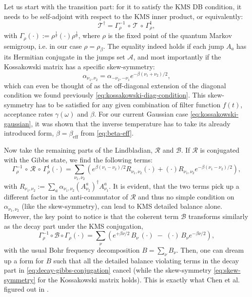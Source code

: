 Let us start with the transition part: for it to satisfy the KMS DB condition, it needs to be self-adjoint with respect to the KMS inner product, or equivalently: 
\begin{equation} \label{eq:transition-self-adjoint}
    \mathcal{T}^\dagger = \Gamma_\rho^{-1}\, \circ \, \mathcal{T}\, \circ\, \Gamma_\rho^{1},
\end{equation}
with $\Gamma_\rho(\cdot) := \rho^{\frac{1}{2}} (\cdot) \rho^{\frac{1}{2}}$, where $\rho$ is the fixed point of the quantum Markov semigroup, i.e. in our case $\rho = \rho_\beta$. The equality indeed holds if each jump $A_a$ has its Hermitian conjugate in the jumps set $\mathcal{A}$, and most importantly if the Kossakowski matrix has a specific skew-symmetry:
\begin{equation} \label{eq:skew-symmetry}
    \alpha_{\nu_1, \nu_2} = \alpha_{-\nu_2, -\nu_1} e^{-\beta(\nu_1 + \nu_2) / 2},
\end{equation}
which can even be thought of as the off-diagonal extension of the diagonal condition we found previously \eqref{eq:kossakowski-diag-condition}.
This skew-symmetry has to be satisfied for any given combination of filter function $f(t)$, acceptance rates $\gamma(\omega)$ and $\beta$. For our current Gaussian case \eqref{eq:kossakowski-gaussian}, it was shown that the inverse temperature has to take its already introduced form, $\beta = \beta_\text{eff}$ from \eqref{eq:beta-eff}. 

Now take the remaining parts of the Lindbladian, $\mathcal{R}$ and $\mathcal{B}$. If $\mathcal{R}$ is conjugated with the Gibbs state, we find the following terms: 
\begin{equation} \label{eq:decay-gibbs-conjugation}
    \Gamma_\rho^{-1}\, \circ \, \mathcal{R}\, \circ\, \Gamma_\rho^{1}(\cdot) =\sum_{\nu_1, \nu_2} \left( e^{\beta(\nu_1 - \nu_2)/2}R_{\nu_1, \nu_2}(\cdot) + (\cdot) R_{\nu_1, \nu_2} e^{-\beta(\nu_1 - \nu_2)/2}\right),
\end{equation}
with $R_{\nu_1, \nu_2} := \sum_a \alpha_{\nu_1, \nu_2} (A^a_{\nu_2})^\dagger A^a_{\nu_1}$. It is evident, that the two terms pick up a different factor in the anti-commutator of $\mathcal{R}$ and thus no simple condition on $\alpha_{\nu_1, \nu_2}$ (like the skew-symmetry), can lead to KMS detailed balance alone. However, the key point to notice is that the coherent term $\mathcal{B}$ transforms similarly as the decay part under the KMS conjugation, 
\begin{equation} \label{eq:coherent-gibbs-conjugation}
    \Gamma_\rho^{-1}\circ\mathcal{B}\circ\Gamma_\rho(\cdot) = \sum_\nu \left(e^{+\beta\nu/2}\,B_\nu\, (\cdot) \;-\; (\cdot)\,B_\nu e^{-\beta\nu/2}\right),
\end{equation}
with the usual Bohr frequency decomposition $B = \sum_\nu B_\nu$. Then, one can dream up a form for $B$ such that all the detailed balance violating terms in the decay part in \eqref{eq:decay-gibbs-conjugation} cancel (while the skew-symmetry \eqref{eq:skew-symmetry} for the Kossakowski matrix holds). This is exactly what Chen et al. figured out in \cite{chen2023efficient}.

